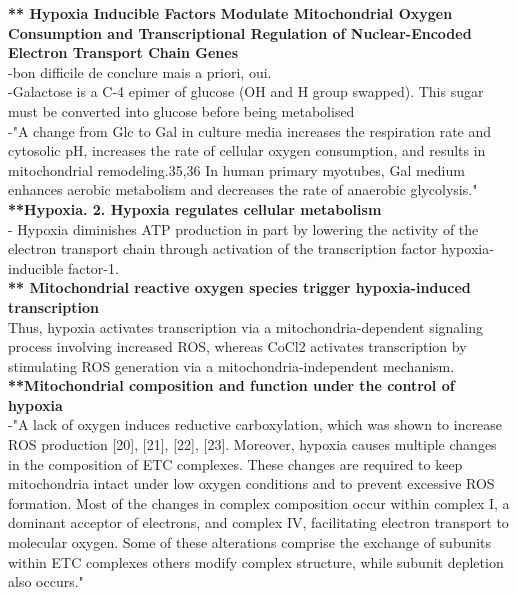 \documentclass[11pt,a4paper]{article}
\begin{document}
\textbf{** Hypoxia Inducible Factors Modulate Mitochondrial Oxygen Consumption and Transcriptional Regulation of Nuclear-Encoded Electron Transport Chain Genes}\\

-bon difficile de conclure mais a priori, oui.\\

-Galactose is a C-4 epimer of glucose (OH and H group swapped). This sugar must be converted into glucose before being metabolised\\

-"A change from Glc to Gal in culture media increases the respiration rate and cytosolic pH, increases the rate of cellular oxygen consumption, and results in mitochondrial remodeling.35,36 In human primary myotubes, Gal medium enhances aerobic metabolism and decreases the rate of anaerobic glycolysis."\\


\textbf{**Hypoxia. 2. Hypoxia regulates cellular metabolism}\\

-  Hypoxia diminishes ATP production in part by lowering the activity of the electron transport chain through activation of the transcription factor hypoxia-inducible factor-1.\\


\textbf{** Mitochondrial reactive oxygen species trigger hypoxia-induced transcription} \\

Thus, hypoxia activates transcription via a mitochondria-dependent signaling process involving increased ROS, whereas CoCl2 activates transcription by stimulating ROS generation via a mitochondria-independent mechanism.\\


\textbf{**Mitochondrial composition and function under the control of hypoxia} \\

-"A lack of oxygen induces reductive carboxylation, which was shown to increase ROS production [20], [21], [22], [23]. Moreover, hypoxia causes multiple changes in the composition of ETC complexes. These changes are required to keep mitochondria intact under low oxygen conditions and to prevent excessive ROS formation. Most of the changes in complex composition occur within complex I, a dominant acceptor of electrons, and complex IV, facilitating electron transport to molecular oxygen. Some of these alterations comprise the exchange of subunits within ETC complexes others modify complex structure, while subunit depletion also occurs."\\
\end{document}
